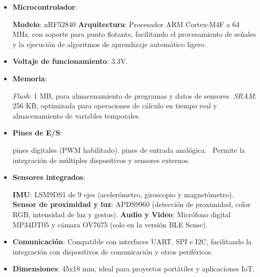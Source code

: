 \documentclass[12pt,a4paper]{article}
\begin{document}
\begin{itemize}
    \item \textbf{Microcontrolador}: 
    
        \subitem \textbf{Modelo}: nRF52840 
        \subitem \textbf{Arquitectura}: Procesador ARM Cortex-M4F a 64 MHz, con soporte para punto flotante, facilitando el procesamiento de señales y la ejecución de algoritmos de aprendizaje automático ligero.
    
    \item \textbf{Voltaje de funcionamiento}: 3.3V.

    \item \textbf{Memoria}: 
    
        \subitem \textit{Flash}: 1 MB, para almacenamiento de programas y datos de sensores.
        \subitem \textit{SRAM}: 256 KB, optimizada para operaciones de cálculo en tiempo real y almacenamiento de variables temporales.
 

    \item \textbf{Pines de E/S}: 

         pines digitales (PWM habilitado).
         pines de entrada analógica. 
    \
    Permite la integración de múltiples dispositivos y sensores externos.

    \item \textbf{Sensores integrados}: 
  
        \subitem \textbf{IMU}: LSM9DS1 de 9 ejes (acelerómetro, giroscopio y magnetómetro).
        \subitem \textbf{Sensor de proximidad y luz}: APDS9960 (detección de proximidad, color RGB, intensidad de luz y gestos).
        \subitem \textbf{Audio y Video}: Micrófono digital MP34DT05 y cámara OV7675 (solo en la versión BLE Sense).


    \item \textbf{Comunicación}: Compatible con interfaces UART, SPI e I2C, facilitando la integración con dispositivos de comunicación y otros periféricos.

    \item \textbf{Dimensiones}: 45x18 mm, ideal para proyectos portátiles y aplicaciones IoT.
\end{itemize}
\end{document}
